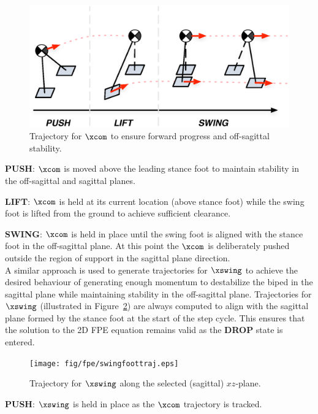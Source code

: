 \begin{figure}[!t]
	\centering
    \includegraphics[scale=0.8]{fig/fpe/comtraj3d.eps} 
  	\caption{Trajectory for $\xcom$ to ensure forward progress and off-sagittal stability.}
	\label{fig:comtraj3d}
\end{figure}

\textbf{PUSH}: $\xcom$ is moved above the leading stance foot to maintain stability in the off-sagittal and sagittal planes.

\textbf{LIFT}: $\xcom$ is held at its current location (above stance foot) while the swing foot is lifted from the ground to achieve sufficient clearance.

\textbf{SWING}: $\xcom$ is held in place until the swing foot is aligned with the stance foot in the off-sagittal plane. At this point the $\xcom$ is deliberately pushed outside the region of support in the sagittal plane direction. \\

A similar approach is used to generate trajectories for $\xswing$ to achieve the desired behaviour of generating enough momentum to destabilize the biped in the sagittal plane while maintaining stability in the off-sagittal plane. Trajectories for $\xswing$ (illustrated in Figure~\ref{fig:swingfoottraj}) are always computed to align with the sagittal plane formed by the stance foot at the start of the step cycle. This ensures that the solution to the 2D FPE equation remains valid as the \textbf{DROP} state is entered. \\

\begin{figure}[!b]
	\centering
    \texttt{[image: fig/fpe/swingfoottraj.eps]} 
  	\caption{Trajectory for $\xswing$ along the selected (sagittal) $xz$-plane.}
	\label{fig:swingfoottraj}
\end{figure}

\textbf{PUSH}: $\xswing$ is held in place as the $\xcom$ trajectory is tracked.

